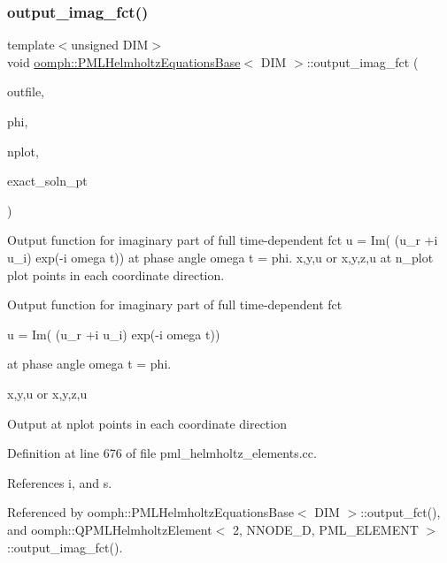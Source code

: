 \subsubsection{\texorpdfstring{output\+\_\+imag\+\_\+fct()}{output\_imag\_fct()}}
{\footnotesize\ttfamily template$<$unsigned D\+IM$>$ \\
void \hyperlink{classoomph_1_1PMLHelmholtzEquationsBase}{oomph\+::\+P\+M\+L\+Helmholtz\+Equations\+Base}$<$ D\+IM $>$\+::output\+\_\+imag\+\_\+fct (\begin{DoxyParamCaption}\item[{std\+::ostream \&}]{outfile,  }\item[{const double \&}]{phi,  }\item[{const unsigned \&}]{nplot,  }\item[{\hyperlink{classoomph_1_1FiniteElement_a690fd33af26cc3e84f39bba6d5a85202}{Finite\+Element\+::\+Steady\+Exact\+Solution\+Fct\+Pt}}]{exact\+\_\+soln\+\_\+pt }\end{DoxyParamCaption})}



Output function for imaginary part of full time-\/dependent fct u = Im( (u\+\_\+r +i u\+\_\+i) exp(-\/i omega t)) at phase angle omega t = phi. x,y,u or x,y,z,u at n\+\_\+plot plot points in each coordinate direction. 

Output function for imaginary part of full time-\/dependent fct

u = Im( (u\+\_\+r +i u\+\_\+i) exp(-\/i omega t))

at phase angle omega t = phi.

x,y,u or x,y,z,u

Output at nplot points in each coordinate direction 

Definition at line 676 of file pml\+\_\+helmholtz\+\_\+elements.\+cc.



References i, and s.



Referenced by oomph\+::\+P\+M\+L\+Helmholtz\+Equations\+Base$<$ D\+I\+M $>$\+::output\+\_\+fct(), and oomph\+::\+Q\+P\+M\+L\+Helmholtz\+Element$<$ 2, N\+N\+O\+D\+E\+\_\+D, P\+M\+L\+\_\+\+E\+L\+E\+M\+E\+N\+T $>$\+::output\+\_\+imag\+\_\+fct().

\mbox{\label{classoomph_1_1PMLHelmholtzEquationsBase_a823895b9525cf2ddb30517a64dc61a85}} 
